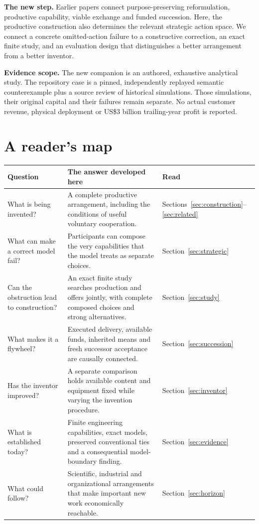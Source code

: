 \textbf{The new step.} Earlier papers connect purpose-preserving reformulation, productive capability, viable exchange and funded succession. Here, the productive construction also determines the relevant strategic action space. We connect a concrete omitted-action failure to a constructive correction, an exact finite study, and an evaluation design that distinguishes a better arrangement from a better inventor.

\textbf{Evidence scope.} The new companion is an authored, exhaustive analytical study. The repository case is a pinned, independently replayed semantic counterexample plus a source review of historical simulations. Those simulations, their original capital and their failures remain separate. No actual customer revenue, physical deployment or US\$3 billion trailing-year profit is reported.

\clearpage
\section*{A reader's map}
\begin{tabularx}{\linewidth}{@{}P{3.1cm}YP{2.1cm}@{}}\toprule
Question & The answer developed here & Read\\\midrule
What is being invented? & A complete productive arrangement, including the conditions of useful voluntary cooperation. & Sections~\ref{sec:construction}--\ref{sec:related}\\
What can make a correct model fail? & Participants can compose the very capabilities that the model treats as separate choices. & Section~\ref{sec:strategic}\\
Can the obstruction lead to construction? & An exact finite study searches production and offers jointly, with complete composed choices and strong alternatives. & Section~\ref{sec:study}\\
What makes it a flywheel? & Executed delivery, available funds, inherited means and fresh successor acceptance are causally connected. & Section~\ref{sec:succession}\\
Has the inventor improved? & A separate comparison holds available content and equipment fixed while varying the invention procedure. & Section~\ref{sec:inventor}\\
What is established today? & Finite engineering capabilities, exact models, preserved conventional ties and a consequential model-boundary finding. & Section~\ref{sec:evidence}\\
What could follow? & Scientific, industrial and organizational arrangements that make important new work economically reachable. & Section~\ref{sec:horizon}\\\bottomrule
\end{tabularx}

